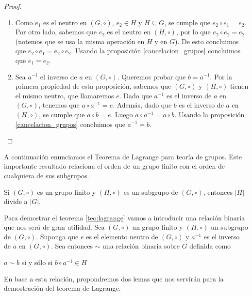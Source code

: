 \begin{proof}
\text{ }
	\begin{enumerate}
	\item 
Como $e_1$ es el neutro en $(G, \circ)$, $e_2\in H$ y $H \subseteq G$, se cumple que $e_2 \circ e_1 = e_2$.
Por otro lado, sabemos que $e_2$ es el neutro en $(H, \circ)$, por lo que $e_2 \circ e_2 = e_2$
(notemos que se usa la misma operación en $H$ y en $G$).
De esto concluimos que $e_2 \circ e_1 = e_2 \circ e_2$. Usando la proposición \ref{cancelacion_grupos} concluimos que $e_1 = e_2$.
	\item 
	Sea $a^{-1}$ el inverso de $a$ en $(G, \circ)$. Queremos probar que $b = a^{-1}$. Por la primera propiedad de esta proposición, sabemos que $(G, \circ)$ y $(H,
\circ)$ tienen el mismo neutro, que llamaremos $e$. 
Dado que $a^{-1}$ es el inverso de $a$ en $(G, \circ)$, tenemos que $a \circ a^{-1} = e$. Además, dado que $b$ es el inverso de $a$ en $(H, \circ)$, se cumple que $a \circ b = e$. Luego $a \circ a^{-1} = a \circ b$. Usando la proposición \ref{cancelacion_grupos} concluimos que $a^{-1} = b$.
	\end{enumerate}
\end{proof}



A continuación enunciamos el Teorema de Lagrange para teoría de grupos. Este importante resultado relaciona el orden de un grupo finito con el orden de cualquiera de sus subgrupos.
\begin{theorem}[{\bf Lagrange}]
\label{teo:lagrange}
Si $(G, \circ)$ es un grupo finito y $(H, \circ)$ es un subgrupo de $(G, \circ)$, entonces $|H|$ divide a $|G|$.
\end{theorem}

Para demostrar el teorema \ref{teo:lagrange} vamos a introducir una relación binaria que nos será de gran utilidad. Sea $(G, \circ)$ un grupo finito y $(H, \circ)$ un subgrupo de $(G, \circ)$. 
Suponga que $e$ es el elemento neutro de $(G,\circ)$ y $a^{-1}$ es el inverso de $a$ en $(G, \circ)$.
Sea entonces $\sim$ una relación binaria sobre $G$ definida
como 
\begin{center}
	$a \sim b$ si y sólo si $b \circ a^{-1} \in H$
\end{center}
En base a esta relación, propondremos dos lemas que nos servirán para la demostración del teorema de Lagrange.


